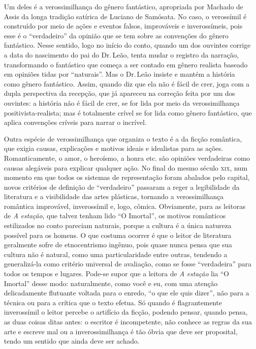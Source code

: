 Um deles é a verossimilhança do gênero fantástico, apropriada por
Machado de Assis da longa tradição satírica de Luciano de Samósata. No
caso, o verossímil é construído por meio de ações e eventos falsos,
improváveis e inverossímeis, pois esse é o ``verdadeiro'' da opinião que
se tem sobre as convenções do gênero fantástico. Nesse sentido, logo no
início do conto, quando um dos ouvintes corrige a data do nascimento do
pai do Dr.\,Leão, tenta mudar o registro da narração, transformando o
fantástico que começa a ser contado em gênero realista baseado em
opiniões tidas por ``naturais''. Mas o Dr.\,Leão insiste e mantém a
história como gênero fantástico. Assim, quando diz que ela não é fácil
de crer, joga com a dupla perspectiva da recepção, que já apareceu na
correção feita por um dos ouvintes: a história não é fácil de crer, se
for lida por meio da verossimilhança positivista-realista; mas é
totalmente crível se for lida como gênero fantástico, que aplica
convenções críveis para narrar o incrível.

Outra espécie de verossimilhança que organiza o texto é a da ficção
romântica, que exigia causas, explicações e motivos ideais e idealistas
para as ações. Romanticamente, o amor, o heroísmo, a honra etc. são
opiniões verdadeiras como causas alegáveis para explicar qualquer ação.
No final do mesmo século \textsc{xix}, num momento em que todos os sistemas de
representação foram abalados pelo capital, novos critérios de definição
de ``verdadeiro'' passaram a reger a legibilidade da literatura e a
visibilidade das artes plásticas, tornando a verossimilhança romântica
improvável, inverossímil e, logo, cômica. Obviamente, para as leitoras
de \emph{A estação,} que talvez tenham lido ``O Imortal'', os motivos
românticos estilizados no conto pareciam naturais, porque a cultura é a
única natureza possível para os homens. O que costuma ocorrer é que o
leitor de literatura geralmente sofre de etnocentrismo ingênuo, pois
quase nunca pensa que sua cultura não é natural, como uma
particularidade entre outras, tendendo a generalizá-la como critério
universal de avaliação, como se fosse ``verdadeira'' para todos os tempos
e lugares. Pode-se supor que a leitora de \emph{A estação} lia ``O
Imortal'' desse modo: naturalmente, como você e eu, com uma atenção
delicadamente flutuante voltada para o enredo, ``o que ele quis dizer'',
não para a técnica ou para a crítica que o texto efetua. Só quando é
flagrantemente inverossímil o leitor percebe o artifício da ficção,
podendo pensar, quando pensa, as duas coisas ditas antes: o escritor é
incompetente, não conhece as regras da sua arte e escreve mal ou a
inverossimilhança é tão óbvia que deve ser proposital, tendo um sentido
que ainda deve ser achado.

